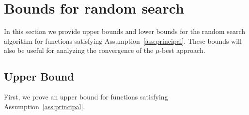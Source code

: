 

\section{Bounds for random search}
\label{sec:randomsearch}
In this section we provide upper bounds and lower bounds for the random search algorithm for functions satisfying Assumption~\ref{ass:principal}. These bounds will also be useful for analyzing the convergence of the $\mu$-best approach.
\subsection{Upper Bound}
First, we prove an upper bound for functions satisfying Assumption~\ref{ass:principal}.

